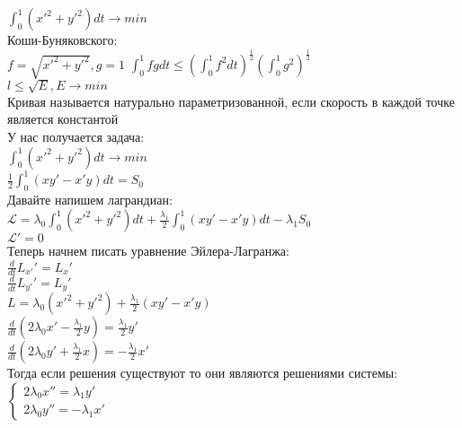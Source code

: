 \documentclass{article}
\newcommand\0{\mathbb{0}}
\newcommand\1{\mathbb{1}}
\begin{document}
$\displaystyle\int_0^1(x'^2 + y'^2)dt \to min$\\
Коши-Буняковского:\\
$f = \sqrt{x'^2 + y'^2}, g = 1$
$\displaystyle\int_0^1 fg dt \leq (\displaystyle\int_0^1 f^2 dt)^\frac{1}{2}(\displaystyle\int_0^1 g^2)^\frac{1}{2}$\\
$l \leq \sqrt{E}, E \to min$\\
Кривая называется натурально параметризованной, если скорость в каждой точке является константой\\
У нас получается задача:\\
$\displaystyle\int_0^1 (x'^2 + y'^2)dt \to min$\\
$\frac{1}{2}\displaystyle\int_0^1 (xy' - x'y)dt = S_0$\\
Давайте напишем лаграндиан:\\
$\mathcal{L} = \lambda_0 \displaystyle\int_0^1 (x'^2 + y'^2)dt + \frac{\lambda_1}{2}\displaystyle\int_0^1 (xy' - x'y)dt - \lambda_1 S_0$\\
$\mathcal{L}' = 0$\\
Теперь начнем писать уравнение Эйлера-Лагранжа:\\
$\frac{d}{dt}L_{x'}' = L_x'$\\
$\frac{d}{dt}L_{y'}' = L_y'$\\
$L = \lambda_0(x'^2 + y'^2) + \frac{\lambda_1}{2}(xy' - x'y)$\\
$\frac{d}{dt}(2\lambda_0x' - \frac{\lambda_1}{2}y) = \frac{\lambda_1}{2}y'$\\
$\frac{d}{dt}(2\lambda_0 y' + \frac{\lambda_1}{2}x) = -\frac{\lambda_1}{2}x'$\\
Тогда если решения существуют то они являются решениями системы:\\
$\begin{cases}
    2\lambda_0x'' = \lambda_1 y'\\
    2\lambda_0 y'' = -\lambda_1x'
\end{cases}$
\end{document}
